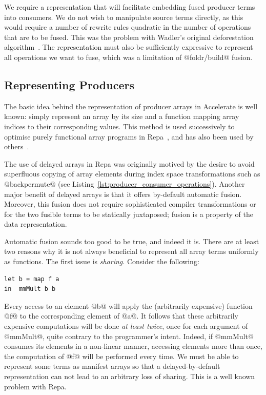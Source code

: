 We require a representation that will facilitate embedding fused producer
terms into consumers. We do not wish to manipulate source terms directly, as
this would require a number of rewrite rules quadratic in the number of
operations that are to be fused. This was the problem with Wadler's original
deforestation algorithm~\cite{Wadler:1981hy,Wadler:1990ix}. The representation
must also be sufficiently expressive to represent all operations we want to
fuse, which was a limitation of @foldr/build@ fusion.


\subsection{Representing Producers}
\label{sec:representing_producers}

The basic idea behind the representation of producer arrays in Accelerate is
well known: simply represent an array by its size and a function mapping array
indices to their corresponding values. This method is used successively to
optimise purely functional array programs in Repa~\cite{Keller:2010er}, and has also been used by
others~\cite{Claessen:2012hl}.

The use of delayed arrays in Repa was originally motived by the desire to avoid
superfluous copying of array elements during index space transformations such as
@backpermute@ (see Listing~\ref{lst:producer_consumer_operations}). Another
major benefit of delayed arrays is that it offers by-default automatic fusion.
Moreover, this fusion does not require sophisticated compiler transformations or
for the two fusible terms to be statically juxtaposed; fusion is a property of
the data representation.

Automatic fusion sounds too good to be true, and indeed it is. There are at
least two reasons why it is not always beneficial to represent all array terms
uniformly as functions. The first issue is \emph{sharing}. Consider the
following:
%
\begin{lstlisting}[style=haskell]
let b = map f a
in  mmMult b b
\end{lstlisting}
%
Every access to an element @b@ will apply the (arbitrarily expensive)
function @f@ to the corresponding element of @a@. It follows that
these arbitrarily expensive computations will be done \emph{at least twice},
once for each argument of @mmMult@, quite contrary to the programmer's
intent. Indeed, if @mmMult@ consumes its elements in a non-linear manner,
accessing elements more than once, the computation of @f@ will be performed
every time. We must be able to represent some terms as manifest arrays so that a
delayed-by-default representation can not lead to an arbitrary loss of sharing.
This is a well known problem with Repa.


